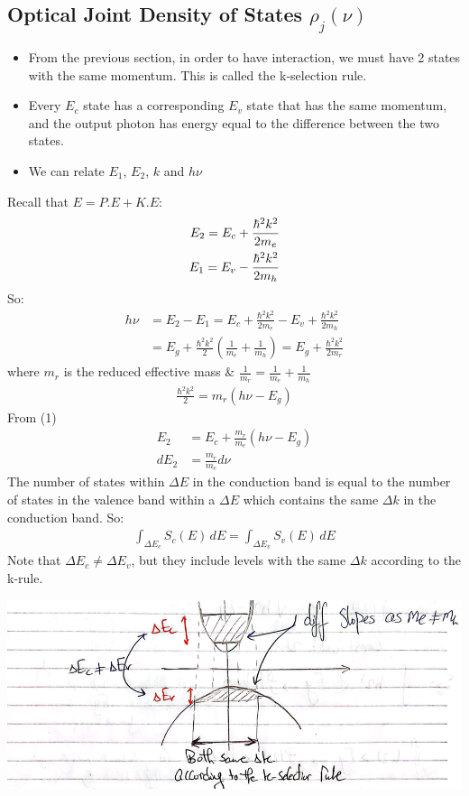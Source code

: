\documentclass[11pt]{article}
\begin{document}
\subsection{Optical Joint Density of States $\rho_j(\nu)$}
\begin{itemize}
    \item From the previous section, in order to have interaction, we must have 2 states with the same momentum. This is called the k-selection rule.
    \item Every $E_c$ state has a corresponding $E_v$ state that has the same momentum, and the output photon has energy equal to the difference between the two states.
    \item We can relate $E_1$, $E_2$, $k$ and $h\nu$
\end{itemize}
Recall that $E = P.E + K.E$:
\begin{align}
    E_2 = E_c + \frac{\hbar^2 k^2}{2 m_e} \\
    E_1 = E_v - \frac{\hbar^2 k^2}{2 m_h} \notag
\end{align}
So:
\begin{align*}
    h \nu &= E_2 - E_1 = E_c + \frac{\hbar^2 k^2}{2 m_e} - E_v + \frac{\hbar^2 k^2}{2 m_h} \\
    &= E_g + \frac{\hbar^2 k^2}{2} \left(\frac{1}{m_e} + \frac{1}{m_h}\right) = E_g + \frac{\hbar^2 k^2}{2 m_r} 
\end{align*}
where $m_r$ is the reduced effective mass \& $\frac{1}{m_r} = \frac{1}{m_e} + \frac{1}{m_h}$
\begin{align*}
    \frac{\hbar^2 k^2}{2} = m_r (h \nu - E_g)
\end{align*}
From (1)
\begin{align*}
    E_2 &= E_c + \frac{m_r}{m_e} (h \nu - E_g) \\
    dE_2 &= \frac{m_r}{m_e} d \nu
\end{align*}
The number of states within $\Delta E$ in the conduction band is equal to the number of states in the valence band within a $\Delta E$ which contains the same $\Delta k$ in the conduction band. So:
\begin{align*}
    \int_{\Delta E_c} S_c(E) \, dE = \int_{\Delta E_v} S_v(E) \, dE
\end{align*}
Note that $\Delta E_c \neq \Delta E_v$, but they include levels with the same $\Delta k$ according to the k-rule.
\begin{center}
    \includegraphics[scale=0.7]{6.png}
\end{center}
\end{document}

